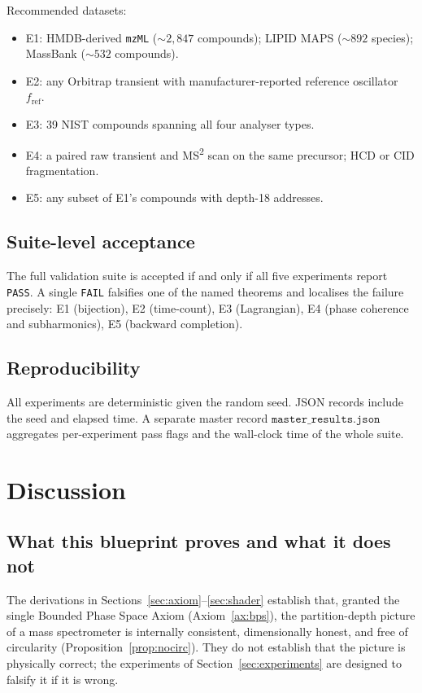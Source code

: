 \documentclass[twocolumn,10pt,a4paper]{article}
\theoremstyle{thmstyle}
\theoremstyle{definition}
\theoremstyle{remark}
\begin{document}
Recommended datasets:
\begin{itemize}[nosep,leftmargin=*]
\item E1: HMDB-derived \texttt{mzML} ($\sim 2{,}847$ compounds);
LIPID MAPS ($\sim 892$ species); MassBank ($\sim 532$ compounds).
\item E2: any Orbitrap transient with manufacturer-reported reference
oscillator $f_{\mathrm{ref}}$.
\item E3: 39 NIST compounds spanning all four analyser types.
\item E4: a paired raw transient and MS\textsuperscript{2} scan on
the same precursor; HCD or CID fragmentation.
\item E5: any subset of E1's compounds with depth-18 addresses.
\end{itemize}

\subsection{Suite-level acceptance}

The full validation suite is accepted if and only if all five
experiments report \texttt{PASS}. A single \texttt{FAIL} falsifies
one of the named theorems and localises the failure precisely: E1
(bijection), E2 (time-count), E3 (Lagrangian), E4 (phase coherence
and subharmonics), E5 (backward completion).

\subsection{Reproducibility}

All experiments are deterministic given the random seed. JSON records
include the seed and elapsed time. A separate master record
$\texttt{master\_results.json}$ aggregates per-experiment pass flags
and the wall-clock time of the whole suite.

\section{Discussion}
\label{sec:discussion}

\subsection{What this blueprint proves and what it does not}

The derivations in Sections~\ref{sec:axiom}--\ref{sec:shader}
establish that, granted the single Bounded Phase Space Axiom
(Axiom~\ref{ax:bps}), the partition-depth picture of a mass
spectrometer is internally consistent, dimensionally honest, and
free of circularity (Proposition~\ref{prop:nocirc}). They do not
establish that the picture is physically correct; the experiments
of Section~\ref{sec:experiments} are designed to falsify it if it is
wrong.
\end{document}
